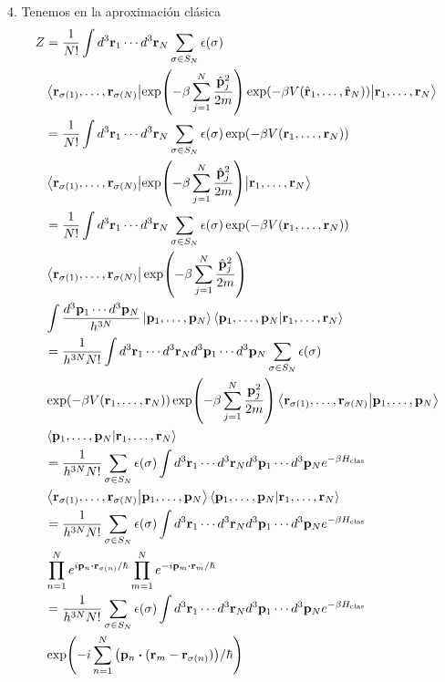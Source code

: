 \documentclass{article}
\begin{document}
4. Tenemos en la aproximación clásica
\begin{align}
\begin{split}
Z&=\frac{1}{N!}\int d^3\vb{r}_1\cdots d^3\vb{r}_N\sum_{\sigma\in S_N}\epsilon(\sigma)\\
&\mel{\vb{r}_{\sigma(1)},\dots,\vb{r}_{\sigma(N)}}{\exp(-\beta\sum_{j=1}^N\frac{\hat{\vb{p}}_j^2}{2m})\exp(-\beta V(\hat{\vb{r}}_1,\dots,\hat{\vb{r}}_N))}{\vb{r}_{1},\dots,\vb{r}_{N}}\\
&=\frac{1}{N!}\int d^3\vb{r}_1\cdots d^3\vb{r}_N\sum_{\sigma\in S_N}\epsilon(\sigma)\exp(-\beta V(\vb{r}_1,\dots,\vb{r}_N))\\
&\mel{\vb{r}_{\sigma(1)},\dots,\vb{r}_{\sigma(N)}}{\exp(-\beta\sum_{j=1}^N\frac{\hat{\vb{p}}_j^2}{2m})}{\vb{r}_{1},\dots,\vb{r}_{N}}\\
&=\frac{1}{N!}\int d^3\vb{r}_1\cdots d^3\vb{r}_N\sum_{\sigma\in S_N}\epsilon(\sigma)\exp(-\beta V(\vb{r}_1,\dots,\vb{r}_N))\\
&\bra{\vb{r}_{\sigma(1)},\dots,\vb{r}_{\sigma(N)}}\exp(-\beta\sum_{j=1}^N\frac{\hat{\vb{p}}_j^2}{2m})\\
&\int \frac{d^3\vb{p}_1\cdots d^3\vb{p}_N}{h^{3N}}\ket{\vb{p}_{1},\dots,\vb{p}_{N}}\ip{\vb{p}_{1},\dots,\vb{p}_{N}}{\vb{r}_{1},\dots,\vb{r}_{N}}\\
&=\frac{1}{h^{3N}N!}\int d^3\vb{r}_1\cdots d^3\vb{r}_N d^3\vb{p}_1\cdots d^3\vb{p}_N\sum_{\sigma\in S_N}\epsilon(\sigma)\\
&\exp(-\beta V(\vb{r}_1,\dots,\vb{r}_N))\exp(-\beta\sum_{j=1}^N\frac{\vb{p}_j^2}{2m})\bra{\vb{r}_{\sigma(1)},\dots,\vb{r}_{\sigma(N)}}\ket{\vb{p}_{1},\dots,\vb{p}_{N}}\\
&\ip{\vb{p}_{1},\dots,\vb{p}_{N}}{\vb{r}_{1},\dots,\vb{r}_{N}}\\
&=\frac{1}{h^{3N}N!}\sum_{\sigma\in S_N}\epsilon(\sigma)\int d^3\vb{r}_1\cdots d^3\vb{r}_N d^3\vb{p}_1\cdots d^3\vb{p}_Ne^{-\beta H_{\text{clas}}}\\
&\ip{\vb{r}_{\sigma(1)},\dots,\vb{r}_{\sigma(N)}}{\vb{p}_{1},\dots,\vb{p}_{N}}\ip{\vb{p}_{1},\dots,\vb{p}_{N}}{\vb{r}_{1},\dots,\vb{r}_{N}}\\
&=\frac{1}{h^{3N}N!}\sum_{\sigma\in S_N}\epsilon(\sigma)\int d^3\vb{r}_1\cdots d^3\vb{r}_N d^3\vb{p}_1\cdots d^3\vb{p}_Ne^{-\beta H_{\text{clas}}}\\
&\prod_{n=1}^Ne^{i\vb{p}_n\vdot\vb{r}_{\sigma(n)}/\hbar}\prod_{m=1}^Ne^{-i\vb{p}_m\vdot\vb{r}_m/\hbar}\\
&=\frac{1}{h^{3N}N!}\sum_{\sigma\in S_N}\epsilon(\sigma)\int d^3\vb{r}_1\cdots d^3\vb{r}_N d^3\vb{p}_1\cdots d^3\vb{p}_Ne^{-\beta H_{\text{clas}}}\\
&\exp(-i\sum_{n=1}^N\qty(\vb{p}_n\vdot(\vb{r}_m-\vb{r}_{\sigma(n)}))/\hbar)\\
\end{split}
\end{align}
\end{document}
